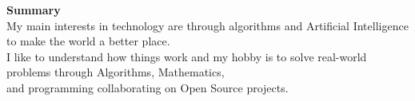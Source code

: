 \par{
{\textbf{Summary}}\\
My main interests in technology are through algorithms and Artificial Intelligence to make the world a better place.\\
I like to understand how things work and my hobby is to solve real-world problems through Algorithms, Mathematics,\\ and programming collaborating on Open Source projects. 
}
